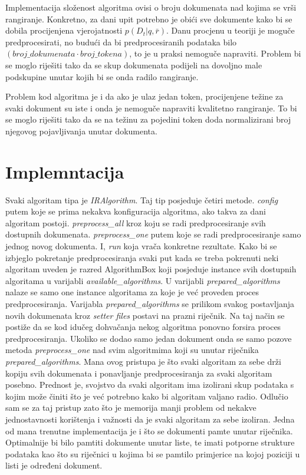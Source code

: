 \documentclass[a4paper,12pt]{article}
\begin{document}
Implementacija složenost algoritma ovisi o broju dokumenata nad kojima se vrši rangiranje. Konkretno, za dani upit potrebno je obići sve dokumente kako bi se dobila procijenjena vjerojatnosti $p(D_t|q, \bar r)$. Danu procjenu u teoriji je moguče predprocesirati, no budući da bi predprocesiranih podataka bilo $(broj\_dokumenata \cdot broj\_tokena)$, to je u praksi nemoguče napraviti. Problem bi se moglo riješiti tako da se skup dokumenata podijeli na dovoljno male podskupine unutar kojih bi se onda radilo rangiranje.

Problem kod algoritma je i da ako je ulaz jedan token, procijenjene težine za svaki dokument su iste i onda je nemoguče napraviti kvalitetno rangiranje. To bi se moglo riješiti tako da se na težinu za pojedini token doda normalizirani broj njegovog pojavljivanja unutar dokumenta.

\section{Implemntacija}

Svaki algoritam tipa je \textit{IRAlgorithm}. Taj tip posjeduje četiri metode. \textit{config} putem koje se prima nekakva konfiguracija algoritma, ako takva za dani algoritam postoji. \textit{preprocess\_all} kroz koju se radi predprocesiranje svih dostupnih dokumenata. \textit{preprocess\_one} putem koje se radi predprocesiranje samo jednog novog dokumenta. I, \textit{run} koja vrača konkretne rezultate. Kako bi se izbjeglo pokretanje predprocesiranja svaki put kada se treba pokrenuti neki algoritam uveden je razred AlgorithmBox koji posjeduje instance svih dostupnih algoritama u varijabli \textit{available\_algorithms}. U varijabli \textit{prepared\_algorithms} nalaze se samo one instance algoritama za koje je već proveden proces predprocesiranja. Varijabla \textit{prepared\_algorithms} se prilikom svakog postavljanja novih dokumenata kroz \textit{setter files} postavi na prazni riječnik. Na taj način se postiže da se kod idučeg dohvačanja nekog algoritma ponovno forsira proces predprocesiranja. Ukoliko se dodao samo jedan dokument onda se samo pozove metoda \textit{preprocess\_one} nad svim algoritmima koji su unutar riječnika \textit{prepared\_algorithms}. Mana ovog pristupa je što svaki algoritam za sebe drži kopiju svih dokumenata i ponavljanje predprocesiranja za svaki algoritam posebno. Prednost je, svojstvo da svaki algoritam ima izolirani skup podataka s kojim može činiti što je već potrebno kako bi algoritam valjano radio. Odlučio sam se za taj pristup zato što je memorija manji problem od nekakve jednostavnosti korištenja i važnosti da je svaki algoritam za sebe izoliran. Jedna od mana trenutne implementacija je i što se dokumenti pamte unutar riječnika. Optimalnije bi bilo pamtiti dokumente unutar liste, te imati potporne strukture podataka kao što su riječnici u kojima bi se pamtilo primjerice na kojoj poziciji u listi je određeni dokument.
\end{document}
